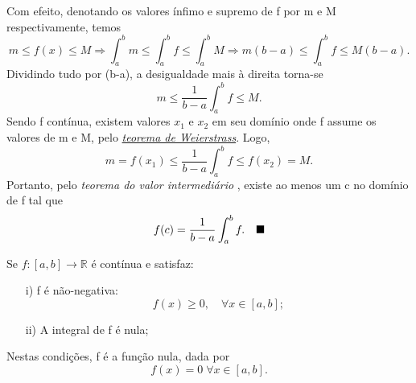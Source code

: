 \documentclass[../analysisII_notes.tex]{subfiles}
\begin{document}
\begin{proof*}
	Com efeito, denotando os valores ínfimo e supremo de f por m e M respectivamente, temos
	\[
		m \leq f(x)\leq M \Rightarrow \int_{a}^{b}m \leq \int_{a}^{b}f \leq \int_{a}^{b} M \Rightarrow m(b-a) \leq \int_{a}^{b}f \leq M(b-a).
	\]
	Dividindo tudo por (b-a), a desigualdade mais à direita torna-se
	\[
		m \leq \frac{1}{b-a}\int_{a}^{b} f \leq M.
	\]
	Sendo f contínua, existem valores \(x_{1}\) e \(x_2\) em seu domínio onde f assume os valores de m e M, pelo \hyperlink{weierstrass_theorem}{\textit{teorema de Weierstrass}}. Logo,
	\[
		m = f(x_1) \leq \frac{1}{b-a}\int_{a}^{b}f \leq f(x_2) = M.
	\]
	Portanto, pelo \textit{teorema do valor intermediário }, existe ao menos um c no domínio de f tal que
	\[
		f(c) = \frac{1}{b-a}\int_{a}^{b}f.\quad \text{$\blacksquare$}
	\]
\end{proof*}
\begin{theorem*}
	Se \(f:[a, b]\rightarrow \mathbb{R}\) é contínua e satisfaz:
	\begin{itemize}
		\item[i)] f é não-negativa:
		      \[
			      f(x)\geq 0, \quad \forall x\in [a, b];
		      \]
		\item[ii)] A integral de f é nula;
	\end{itemize}
	Nestas condições, f é a função nula, dada por
	\[
		f(x) = 0\; \forall x\in [a, b].
	\]
\end{theorem*}
\end{document}
